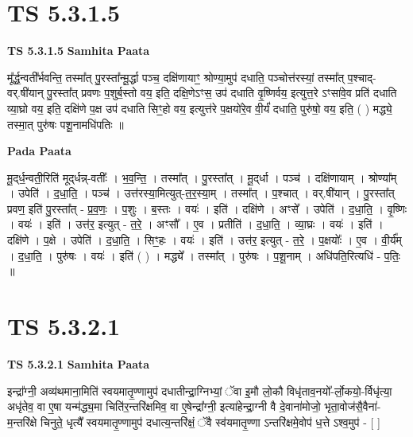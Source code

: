 \documentclass[17pt]{extarticle}
\begin{document}

\section{ TS 5.3.1.5 }

\textbf{TS 5.3.1.5 } \newline
\textbf{Samhita Paata} \newline

मू᳚र्द्ध॒न्वती᳚र्भवन्ति॒ तस्मा᳚त् पु॒रस्ता᳚न्मू॒र्द्धा पञ्च॒ दक्षि॑णायाꣳ॒॒ श्रोण्या॒मुप॑ दधाति॒ पञ्चोत्त॑रस्यां॒ तस्मा᳚त् प॒श्चाद्-वर्.षी॑यान् पु॒रस्ता᳚त् प्रवणः प॒शुर्ब॒स्तो वय॒ इति॒ दक्षि॒णेऽꣳस॒ उप॑ दधाति वृ॒ष्णिर्वय॒ इत्युत्त॒रे ऽꣳसा॑वे॒व प्रति॑ दधाति व्या॒घ्रो वय॒ इति॒ दक्षि॑णे प॒क्ष उप॑ दधाति सिꣳ॒॒हो वय॒ इत्युत्त॑रे प॒क्षयो॑रे॒व वी॒र्यं॑ दधाति॒ पुरु॑षो॒ वय॒ इति॒ ( ) मद्ध्ये॒ तस्मा॒त् पुरु॑षः पशू॒नामधि॑पतिः ॥ \newline

\textbf{Pada Paata} \newline

मू॒द्‌र्ध॒न्वती॒रिति॑ मूद्‌र्धन्न्-वतीः᳚ । भ॒व॒न्ति॒ । तस्मा᳚त् । पु॒रस्ता᳚त् । मू॒द्‌र्धा । पञ्च॑ । दक्षि॑णायाम् । श्रोण्या᳚म् । उपेति॑ । द॒धा॒ति॒ । पञ्च॑ । उत्त॑रस्या॒मित्युत्-त॒र॒स्या॒म् । तस्मा᳚त् । प॒श्चात् । वर्.षी॑यान् । पु॒रस्ता᳚त् प्रवण॒ इति॑ पु॒रस्ता᳚त् - प्र॒व॒णः॒ । प॒शुः । ब॒स्तः । वयः॑ । इति॑ । दक्षि॑णे । अꣳसे᳚ । उपेति॑ । द॒धा॒ति॒ । वृ॒ष्णिः । वयः॑ । इति॑ । उत्त॑र॒ इत्युत् - त॒रे॒ । अꣳसौ᳚ । ए॒व । प्रतीति॑ । द॒धा॒ति॒ । व्या॒घ्रः । वयः॑ । इति॑ । दक्षि॑णे । प॒क्षे । उपेति॑ । द॒धा॒ति॒ । सिꣳ॒॒हः । वयः॑ । इति॑ । उत्त॑र॒ इत्युत् - त॒रे॒ । प॒क्षयोः᳚ । ए॒व । वी॒र्य᳚म् । द॒धा॒ति॒ । पुरु॑षः । वयः॑ । इति॑ ( ) । मद्ध्ये᳚ । तस्मा᳚त् । पुरु॑षः । प॒शू॒नाम् । अधि॑पति॒रित्यधि॑ - प॒तिः॒ ॥  \newline





\section{ TS 5.3.2.1 }

\textbf{TS 5.3.2.1 } \newline
\textbf{Samhita Paata} \newline

इन्द्रा᳚ग्नी॒ अव्य॑थमाना॒मिति॑ स्वयमातृ॒ण्णामुप॑ दधातीन्द्रा॒ग्निभ्यां॒ ॅवा इ॒मौ लो॒कौ विधृ॑ताव॒नयो᳚-र्लो॒कयो॒-र्विधृ॑त्या॒ अधृ॑तेव॒ वा ए॒षा यन्म॑द्ध्य॒मा चिति॑र॒न्तरि॑क्षमिव॒ वा ए॒षेन्द्रा᳚ग्नी॒ इत्या॑हेन्द्रा॒ग्नी वै दे॒वाना॑मोजो॒ भृता॒वोज॑सै॒वैना॑-म॒न्तरि॑क्षे चिनुते॒ धृत्यै᳚ स्वयमातृ॒ण्णामुप॑ दधात्य॒न्तरि॑क्षं॒ ॅवै स्व॑यमातृ॒ण्णा ऽन्तरि॑क्षमे॒वोप॑ ध॒त्ते ऽश्व॒मुप॑ - [  ] \newline
\end{document}
